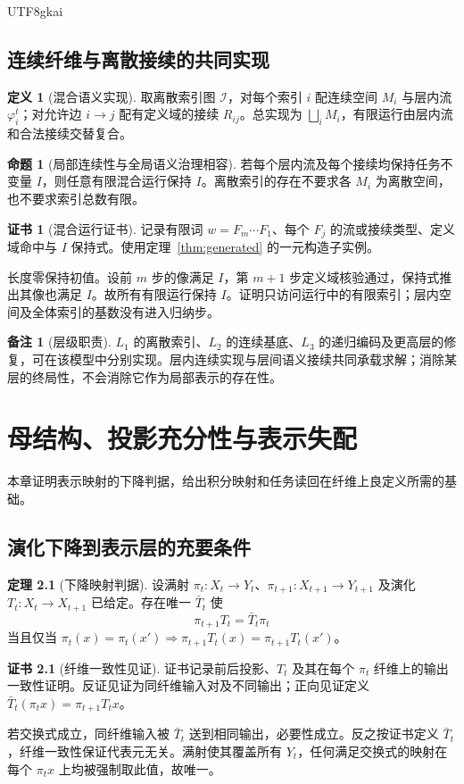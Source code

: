 \documentclass[12pt]{report}
\makeatletter
\theoremstyle{definition}
\newtheorem{definition}{定义}[chapter]
\newtheorem{theorem}{定理}[chapter]
\newtheorem{proposition}{命题}[chapter]
\newtheorem{remark}{备注}[chapter]
\newtheorem{Certificate}{证书}[chapter]
\renewenvironment{proof}[1][\proofname]{\par
  \pushQED{\qed}\normalfont
  \topsep6\p@\@plus6\p@\relax
  \trivlist
  \item[\hskip\labelsep\normalfont #1\@addpunct{.}]\ignorespaces
}{
  \popQED\endtrivlist\@endpefalse
}
\makeatother
\begin{document}
\begin{CJK*}{UTF8}{gkai}
\section{连续纤维与离散接续的共同实现}
\begin{definition}[混合语义实现]
取离散索引图 \(\mathcal I\)，对每个索引 \(i\) 配连续空间 \(M_i\) 与层内流 \(\varphi_i^t\)；对允许边 \(i\to j\) 配有定义域的接续 \(R_{ij}\)。总实现为 \(\bigsqcup_iM_i\)，有限运行由层内流和合法接续交替复合。
\end{definition}
\begin{proposition}[局部连续性与全局语义治理相容]
\label{prop:hybrid}
若每个层内流及每个接续均保持任务不变量 \(I\)，则任意有限混合运行保持 \(I\)。离散索引的存在不要求各 \(M_i\) 为离散空间，也不要求索引总数有限。
\end{proposition}
\begin{Certificate}[混合运行证书]
记录有限词 \(w=F_m\cdots F_1\)、每个 \(F_j\) 的流或接续类型、定义域命中与 \(I\) 保持式。使用定理~\ref{thm:generated} 的一元构造子实例。
\end{Certificate}
\begin{proof}
长度零保持初值。设前 \(m\) 步的像满足 \(I\)，第 \(m+1\) 步定义域核验通过，保持式推出其像也满足 \(I\)。故所有有限运行保持 \(I\)。证明只访问运行中的有限索引；层内空间及全体索引的基数没有进入归纳步。
\end{proof}
\begin{remark}[层级职责]
\(L_1\) 的离散索引、\(L_2\) 的连续基底、\(L_3\) 的递归编码及更高层的修复，可在该模型中分别实现\cite{layers}。层内连续实现与层间语义接续共同承载求解；消除某层的终局性，不会消除它作为局部表示的存在性。
\end{remark}

\chapter{母结构、投影充分性与表示失配}
\label{sec:projection}
本章证明表示映射的下降判据，给出积分映射和任务读回在纤维上良定义所需的基础。
\section{演化下降到表示层的充要条件}
\begin{theorem}[下降映射判据]
\label{thm:descent}
设满射 \(\pi_t:X_t\to Y_t\)、\(\pi_{t+1}:X_{t+1}\to Y_{t+1}\) 及演化 \(T_t:X_t\to X_{t+1}\) 已给定。存在唯一 \(\bar T_t\) 使
\[
\pi_{t+1}T_t=\bar T_t\pi_t
\]
当且仅当 \(\pi_t(x)=\pi_t(x')\Rightarrow\pi_{t+1}T_t(x)=\pi_{t+1}T_t(x')\)。
\end{theorem}
\begin{Certificate}[纤维一致性见证]
证书记录前后投影、\(T_t\) 及其在每个 \(\pi_t\) 纤维上的输出一致性证明。反证见证为同纤维输入对及不同输出；正向见证定义 \(\bar T_t(\pi_t x)=\pi_{t+1}T_t x\)。
\end{Certificate}
\begin{proof}
若交换式成立，同纤维输入被 \(\bar T_t\) 送到相同输出，必要性成立。反之按证书定义 \(\bar T_t\)，纤维一致性保证代表元无关。满射使其覆盖所有 \(Y_t\)，任何满足交换式的映射在每个 \(\pi_t x\) 上均被强制取此值，故唯一。
\end{proof}


\end{CJK*}
\end{document}
